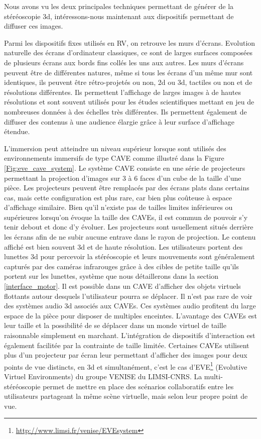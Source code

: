 Nous avons vu les deux principales techniques permettant de générer de la stéréoscopie 3d, intéressons-nous maintenant aux dispositifs permettant de diffuser ces images.

 \label{dispo_fix}

Parmi les dispositifs fixes utilisés en RV, on retrouve les murs d'écrans. Evolution naturelle des écrans d'ordinateur classiques, ce sont de larges surfaces composées de plusieurs écrans aux bords fins collés les uns aux autres. Les murs d'écrans peuvent être de différentes natures, même si tous les écrans d'un même mur sont identiques, ils peuvent être rétro-projetés ou non, 2d ou 3d, tactiles ou non et de résolutions différentes. Ils permettent l'affichage de larges images à de hautes résolutions et sont souvent utilisés pour les études scientifiques mettant en jeu de nombreuses données à des échelles très différentes. Ils permettent également de diffuser des contenus à une audience élargie grâce à leur surface d'affichage étendue.

L'immersion peut atteindre un niveau supérieur lorsque sont utilisés des environnements immersifs de type CAVE \cite{cruz-neira_cave:_1992} comme illustré dans la Figure \ref{Fig:eve_cave_system}. Le système CAVE consiste en une série de projecteurs permettant la projection d'images sur 3 à 6 faces d'un cube de la taille d'une pièce. Les projecteurs peuvent être remplacés par des écrans plats dans certains cas, mais cette configuration est plus rare, car bien plus coûteuse à espace d'affichage similaire. Bien qu'il n'existe pas de tailles limites inférieures ou supérieures lorsqu'on évoque la taille des CAVEs, il est commun de pouvoir s'y tenir debout et donc d'y évoluer. Les projecteurs sont usuellement situés derrière les écrans afin de ne subir aucune entrave dans le rayon de projection. Le contenu affiché est bien souvent 3d et de haute résolution. Les utilisateurs portent des lunettes 3d pour percevoir la stéréoscopie et leurs mouvements sont généralement capturés par des caméras infrarouges grâce à des cibles de petite taille qu'ils portent sur les lunettes, système que nous détaillerons dans la section \ref{interface_motor}. Il est possible dans un CAVE d'afficher des objets virtuels flottants autour desquels l'utilisateur pourra se déplacer.
Il n'est pas rare de voir des systèmes audio 3d associés aux CAVEs. Ces systèmes audio profitent du large espace de la pièce pour disposer de multiples enceintes.
L'avantage des CAVEs est leur taille et la possibilité de se déplacer dans un monde virtuel de taille raisonnable simplement en marchant. L'intégration de dispositifs d'interaction est également facilitée par la contrainte de taille limitée. 
Certaines CAVEs utilisent plus d'un projecteur par écran leur permettant d'afficher des images pour deux points de vue distincts, en 3d et simultanément, c'est le cas d'EVE\footnote{\url{http://www.limsi.fr/venise/EVEsystem}} (Evolutive Virtuel Environments) du groupe VENISE du LIMSI-CNRS. La multi-stéréoscopie permet de mettre en place des scénarios collaboratifs entre les utilisateurs partageant la même scène virtuelle, mais selon leur propre point de vue.

